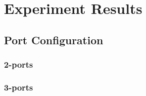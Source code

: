 \section{Experiment Results}
\subsection{Port Configuration}
\subsubsection{2-ports}
\begin{figure}[H]
	
\end{figure}

\begin{figure}[H]
	
\end{figure}

\begin{figure}[H]
	
\end{figure}

\begin{figure}[H]
	
\end{figure}

\begin{figure}[H]
	
\end{figure}

\begin{figure}[H]
	
\end{figure}

\begin{figure}[H]
	
\end{figure}

\begin{figure}[H]
	
\end{figure}

\subsubsection{3-ports}
\begin{figure}[H]
	
\end{figure}

